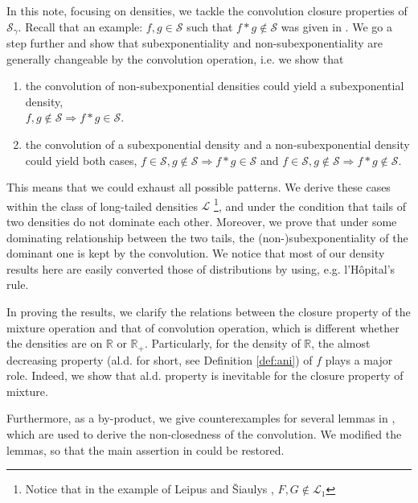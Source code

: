 \documentclass[12pt,leqno]{amsart}
\newcommand{\R}{\mathbb{R}}
\newcommand{\cals}{{\mathcal S}}
\newcommand{\call}{{\mathcal L}}
\newcommand{\1}{{\mathbf 1}}
\begin{document}
In this note, focusing on densities, we tackle the convolution closure properties of $\cals_\gamma$. 
Recall that an example: $f,g\in \cals$ such that $f\ast g\notin \cals$ was given in \cite{Kluppelberg:Villasenor:1991}. 
We go a step further and show that 
subexponentiality and non-subexponentiality are generally changeable by the convolution operation, 
i.e. we show that 
\begin{enumerate}%
 \item the convolution of non-subexponential densities could yield a subexponential density, \\
$f,g\notin \cals \Rightarrow f\ast g\in \cals$. 
\item the convolution of a subexponential density and a non-subexponential density could yield 
both cases, $f\in \cals,g\notin\cals \Rightarrow f\ast g\in \cals$ and $f\in \cals,g\notin\cals \Rightarrow f\ast g\notin \cals$. 
\end{enumerate}
This means that we could exhaust all possible patterns.
We derive these cases within the class of long-tailed densities $\call$
\footnote{Notice that in the example of Leipus and \v{S}iaulys \cite{Leipus:Siaulys:2020}, $F,G\notin \call_1$}, and under the condition 
that tails of two densities do not dominate each other. 
Moreover, we prove that under some dominating relationship between the two tails, the (non-)subexponentiality of the dominant one is 
kept by the convolution. 
We notice that most of our density results here are easily converted those of distributions 
by using, e.g. l'H\^opital's rule. 



In proving the results, we clarify the relations between the closure property of 
the mixture operation and that of convolution operation, which is different 
whether the densities are on $\R$ or $\R_+$. Particularly, for the 
density of $\R$, the almost decreasing property (al.d. for short, see Definition \ref{def:ani}) of $f$ plays a major role.
Indeed, we show that al.d. property is inevitable for the closure property of mixture. 

Furthermore, as a by-product, we give counterexamples for several lemmas in 
\cite{Kluppelberg:Villasenor:1991}, which are used to derive the non-closedness 
of the convolution. We modified the lemmas, so that the main assertion in \cite{Kluppelberg:Villasenor:1991} 
could be restored.
\end{document}
